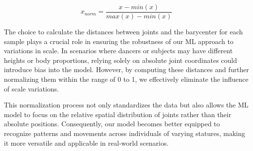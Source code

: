 \begin{equation}
    x_{norm} = \frac{{x - min(x)}}{{max(x) - min(x)}}
    \label{formula:normalization}
\end{equation}
    
The choice to calculate the distances between joints and the barycenter for each sample plays a crucial role in ensuring the robustness of our ML approach to variations in scale.
In scenarios where dancers or subjects may have different heights or body proportions, relying solely on absolute joint coordinates could introduce bias into the model.
However, by computing these distances and further normalizing them within the range of 0 to 1, we effectively eliminate the influence of scale variations.

This normalization process not only standardizes the data but also allows the ML model to focus on the relative spatial distribution of joints rather than their absolute positions.
Consequently, our model becomes better equipped to recognize patterns and movements across individuals of varying statures, making it more versatile and applicable in real-world scenarios. \\

